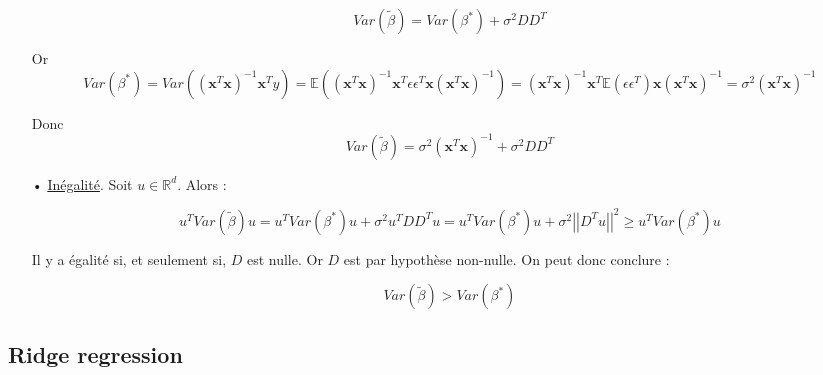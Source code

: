 \documentclass[a4paper, 10pt]{article}
\newcommand{\E}{\mathbb{E}}
\newcommand{\R}{\mathbb{R}}
\begin{document}
\begin{itemize}
\[ Var \left( \tilde{\beta} \right) = Var \left( \beta^{*} \right) + \sigma^{2} DD^{T} \]

Or \[ Var \left( \beta^{*} \right) = Var \left( \left( \textbf{x}^{T}\textbf{x} \right)^{-1} \textbf{x}^{T} y \right) = \E \left( \left( \textbf{x}^{T}\textbf{x} \right)^{-1}\textbf{x}^{T} \epsilon \epsilon^{T} \textbf{x} \left( \textbf{x}^{T}\textbf{x} \right)^{-1} \right ) = \left( \textbf{x}^{T}\textbf{x} \right)^{-1}\textbf{x}^{T} \E \left( \epsilon \epsilon^{T} \right) \textbf{x} \left( \textbf{x}^{T}\textbf{x} \right)^{-1} = \sigma^{2} \left( \textbf{x}^{T}\textbf{x} \right)^{-1} \]

Donc \[ \boxed{Var \left( \tilde{\beta} \right) = \sigma^{2} \left( \textbf{x}^{T}\textbf{x} \right)^{-1} + \sigma^{2}DD^{T}} \]

	\item[•] \underline{Inégalité}. Soit $u \in \R^{d}$. Alors :

\[ u^{T} Var \left( \tilde{\beta} \right) u = u^{T} Var \left( \beta^{*} \right) u + \sigma^{2} u^{T}DD^{T}u = u^{T} Var \left( \beta^{*} \right) u + \sigma^{2} \left|\left| D^{T}u \right|\right|^{2} \geq u^{T} Var \left( \beta^{*} \right) u \] 

Il y a égalité si, et seulement si, $D$ est nulle. Or $D$ est par hypothèse non-nulle. On peut donc conclure :

\[ \boxed{Var \left( \tilde{\beta} \right) > Var \left( \beta^{*} \right)} \]

\end{itemize}
	
	\subsection{Ridge regression}
	
\end{document}
